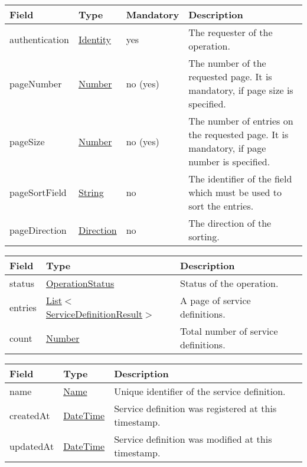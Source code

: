 \documentclass[a4paper]{arrowhead}
\newcommand{\pref}[1]{{\textcolor{ArrowheadGrey}{\hyperref[sec:model:primitives:#1]{#1}}}}
\begin{document}
\label{sec:model:PageRequest}

\begin{table}[ht!]
\begin{tabularx}{\textwidth}{| p{2.5cm} | p{2.5cm} | p{2cm} | X |} \hline
\rowcolor{gray!33} Field & Type & Mandatory & Description \\ \hline
authentication & \hyperref[sec:model:Identity]{Identity} & yes & The requester of the operation. \\ \hline
pageNumber & \pref{Number} & no (yes) & The number of the requested page. It is mandatory, if page size is specified. \\ \hline
pageSize & \pref{Number} & no (yes) & The number of entries on the requested page. It is mandatory, if page number is specified. \\ \hline
pageSortField & \pref{String} & no & The identifier of the field which must be used to sort the entries. \\ \hline
pageDirection & \pref{Direction} & no & The direction of the sorting. \\ \hline
\end{tabularx}
\end{table}

\label{sec:model:ServiceDefinitionListResponse}

\begin{table}[ht!]
\begin{tabularx}{\textwidth}{| p{2.5cm} | p{5cm} | X |} \hline
\rowcolor{gray!33} Field & Type      & Description \\ \hline
status & \pref{OperationStatus} & Status of the operation. \\ \hline
entries & \pref{List}$<$\hyperref[sec:model:ServiceDefinitionResult]{ServiceDefinitionResult}$>$ & A page of service definitions. \\ \hline
count & \pref{Number} & Total number of service definitions. \\ \hline
\end{tabularx}
\end{table}

\label{sec:model:ServiceDefinitionResult}
 
\begin{table}[ht!]
\begin{tabularx}{\textwidth}{| p{2.5cm} | p{2.5cm} | X |} \hline
\rowcolor{gray!33} Field & Type      & Description \\ \hline
name & \pref{Name} & Unique identifier of the service definition. \\ \hline
createdAt & \pref{DateTime} & Service definition was registered at this timestamp. \\ \hline
updatedAt & \pref{DateTime} & Service definition was modified at this timestamp. \\ \hline
\end{tabularx}
\end{table}
\end{document}
